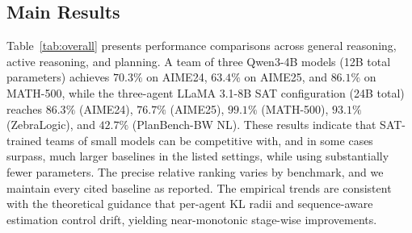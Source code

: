 \documentclass[sigconf]{aamas}
\begin{document}
\subsection{Main Results}
\label{sec:main-result}

Table~\ref{tab:overall} presents performance comparisons across general reasoning, active reasoning, and planning. A team of three Qwen3-4B models (12B total parameters) achieves $70.3\%$ on AIME24, $63.4\%$ on AIME25, and $86.1\%$ on MATH-500, while the three-agent LLaMA 3.1-8B SAT configuration (24B total) reaches $86.3\%$ (AIME24), $76.7\%$ (AIME25), $99.1\%$ (MATH-500), $93.1\%$ (ZebraLogic), and $42.7\%$ (PlanBench-BW NL). These results indicate that SAT-trained teams of small models can be competitive with, and in some cases surpass, much larger baselines in the listed settings, while using substantially fewer parameters. The precise relative ranking varies by benchmark, and we maintain every cited baseline as reported. The empirical trends are consistent with the theoretical guidance that per-agent KL radii and sequence-aware estimation control drift, yielding near-monotonic stage-wise improvements.
\end{document}
